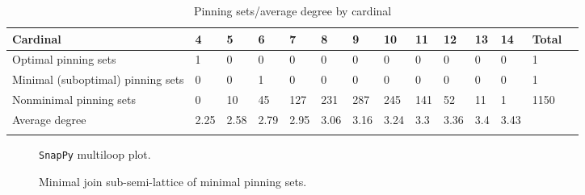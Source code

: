 \documentclass{article}%
\begin{document}
\begin{table}[ht]
	\caption{Pinning sets/average degree by cardinal}
	\centering
	\renewcommand{\arraystretch}{1.5}
	\begin{tabularx}{\textwidth}{lXXXXXXXXXXXXX}
		\toprule
			Cardinal & 4 & 5 & 6 & 7 & 8 & 9 & 10 & 11 & 12 & 13 & 14 & Total\\
			\hline
			Optimal pinning sets & 1 & 0 & 0 & 0 & 0 & 0 & 0 & 0 & 0 & 0 & 0 & 1 \\
			Minimal (suboptimal) pinning sets & 0 & 0 & 1 & 0 & 0 & 0 & 0 & 0 & 0 & 0 & 0 & 1 \\
			Nonminimal pinning sets & 0 & 10 & 45 & 127 & 231 & 287 & 245 & 141 & 52 & 11 & 1 & 1150 \\
			Average degree & 2.25 & 2.58 & 2.79 & 2.95 & 3.06 & 3.16 & 3.24 & 3.3 & 3.36 & 3.4 & 3.43 &  \\
		\bottomrule \\ 
	\end{tabularx}
\end{table}

\begin{multicols}{2}
\begin{figure}[H]
\centering

\caption{\texttt{SnapPy} multiloop plot.}
\label{fig:tex/img/[(1, 7, 2, 6), (24, 7, 1, 8), (5, 10, 6, 11), (3, 13, 4, 12), (9, 15, 10, 14), (8, 15, 9, 16), (13, 18, 14, 19), (4, 19, 5, 20), (2, 22, 3, 21), (11, 21, 12, 20), (17, 23, 18, 22), (16, 23, 17, 24)].svg}
\end{figure}
\columnbreak

\begin{figure}[H]
\centering
\scalebox{0.8}{}
\caption{Minimal join sub-semi-lattice of minimal pinning sets.}
\label{fig:tex/img/[(1, 7, 2, 6), (24, 7, 1, 8), (5, 10, 6, 11), (3, 13, 4, 12), (9, 15, 10, 14), (8, 15, 9, 16), (13, 18, 14, 19), (4, 19, 5, 20), (2, 22, 3, 21), (11, 21, 12, 20), (17, 23, 18, 22), (16, 23, 17, 24)].pgf}
\end{figure}
\end{multicols}

\newpage
\end{document}
